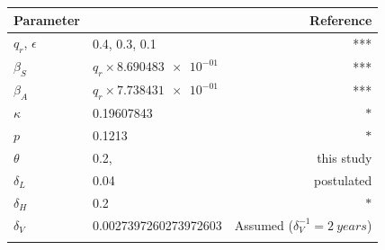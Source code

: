   \begin{table}
    \centering
    \begin{tabular}{@{}llr@{}}
    \toprule
        Parameter
        &   \centering{Median}
        &   Reference
        \\
        \midrule
          $q_r$, $\epsilon$
            &
              \num{.4}, \num{.3}, \num{.1}
            &
              ***
        \\
            $\beta_S$
            & $q_r \times \num{8.690483e-01} $
            & ***
        \\
            $\beta_A$
            & $q_r \times \num{7.738431e-01}$
            & ***

        \\
            $\kappa$
            & \num{0.19607843}
            & $*$
        \\
            $p$
            & \num{0.1213}
            & $*$
        \\
          $\theta$
          & \num{0.2},
          & this study
        \\
          $\delta_L$
          & \num{0.04}
          & postulated
        \\
            $\delta_H$
            &\num{0.2}
            & $*$
        \\
          $\delta_V$
          &\num{ 0.0027397260273972603}
          & Assumed ($\delta_V ^{-1} = \SI{2}{years}$)
        \\
        &&


\end{tabular}
\end{table}
